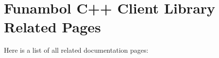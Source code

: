 \section{Funambol C++ Client Library Related Pages}
Here is a list of all related documentation pages:\begin{CompactList}
\item {}

\item {}

\end{CompactList}
